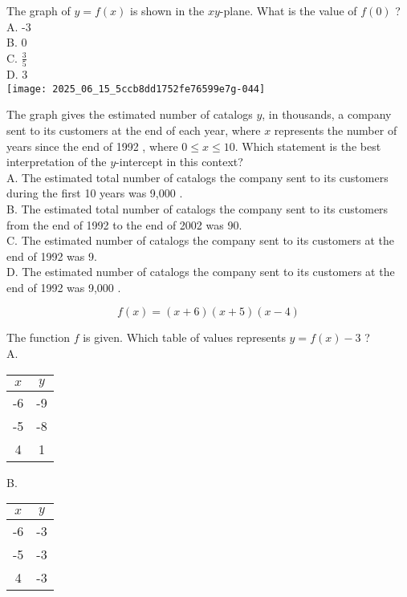 The graph of $y=f(x)$ is shown in the $x y$-plane. What is the value of $f(0)$ ?\\
A. -3\\
B. 0\\
C. $\frac{3}{5}$\\
D. 3\\
\texttt{[image: 2025\_06\_15\_5ccb8dd1752fe76599e7g-044]}

The graph gives the estimated number of catalogs $y$, in thousands, a company sent to its customers at the end of each year, where $x$ represents the number of years since the end of 1992 , where $0 \leq x \leq 10$. Which statement is the best interpretation of the $y$-intercept in this context?\\
A. The estimated total number of catalogs the company sent to its customers during the first 10 years was 9,000 .\\
B. The estimated total number of catalogs the company sent to its customers from the end of 1992 to the end of 2002 was 90.\\
C. The estimated number of catalogs the company sent to its customers at the end of 1992 was 9.\\
D. The estimated number of catalogs the company sent to its customers at the end of 1992 was 9,000 .

$$
f(x)=(x+6)(x+5)(x-4)
$$

The function $f$ is given. Which table of values represents $y=f(x)-3$ ?\\
A.

\begin{center}
\begin{tabular}{|c|c|}
\hline
$x$ & $y$ \\
\hline
-6 & -9 \\
\hline
-5 & -8 \\
\hline
4 & 1 \\
\hline
\end{tabular}
\end{center}

B.

\begin{center}
\begin{tabular}{|c|c|}
\hline
$x$ & $y$ \\
\hline
-6 & -3 \\
\hline
-5 & -3 \\
\hline
4 & -3 \\
\hline
\end{tabular}
\end{center}

